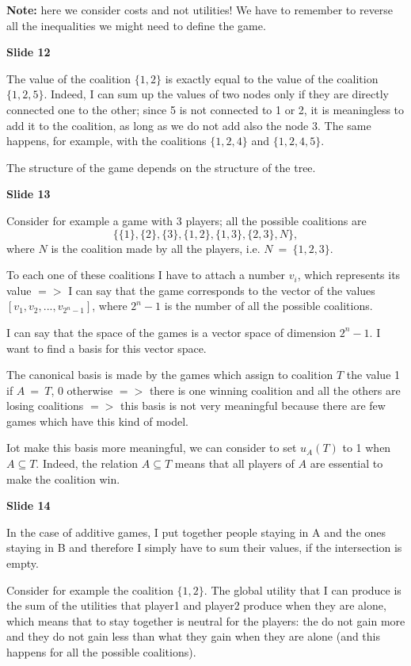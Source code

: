 \noindent \textbf{Note:} here we consider costs and not utilities! We have to 
remember to reverse all the inequalities we might need to define the game.

\bigskip
\noindent \textbf{Slide 12}

\noindent The value of the coalition $\{1,2\}$ is exactly equal to the value 
of the coalition $\{1,2,5\}$. Indeed, I can sum up the values of two nodes 
only if they are directly connected one to the other; since 5 is not 
connected to 1 or 2, it is meaningless to add it to the coalition, as long 
as we do not add also the node 3. The same happens, for example, with the 
coalitions $\{1,2,4\}$ and $\{1,2,4,5\}$.

\noindent The structure of the game depends on the structure of the tree.

\bigskip
\noindent \textbf{Slide 13}

\noindent Consider for example a game with 3 players; all the possible 
coalitions are
\[
	\{\{1\}, \{2\}, \{3\}, \{1,2\}, \{1,3\}, \{2,3\}, N\},
\]
where $N$ is the coalition made by all the players, i.e. $N~=~\{1,2,3\}$.

\noindent To each one of these coalitions I have to attach a number $v_i$, 
which represents its value $=>$ I can say that the game corresponds to the 
vector of the values $[v_1, v_2, ..., v_{2^n-1}]$, where $2^n-1$ is the 
number of all the possible coalitions.

\noindent I can say that the space of the games is a vector space of 
dimension $2^n-1$. I want to find a basis for this vector space.

\noindent The canonical basis is made by the games which assign to coalition 
$T$ the value 1 if $A~=~T$, 0 otherwise $=>$ there is one winning coalition 
and all the others are losing coalitions $=>$ this basis is not very 
meaningful because there are few games which have this kind of model.

\noindent Iot make this basis more meaningful, we can consider to set $u_A(T)$ 
to 1 when $A \subseteq T$. Indeed, the relation $A \subseteq T$ means that 
all players of $A$ are essential to make the coalition win. 

\bigskip
\noindent \textbf{Slide 14} 

\noindent In the case of additive games, I put together people staying in A 
and the ones staying in B and therefore I simply have to sum their values, 
if the intersection is empty.

\noindent Consider for example the coalition $\{1,2\}$. The global utility 
that I can produce is the sum of the utilities that player1 and player2 
produce when they are alone, which means that to stay together is neutral 
for the players: the do not gain more and they do not gain less than what 
they gain when they are alone (and this happens for all the possible 
coalitions).

